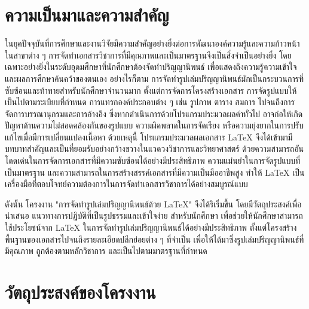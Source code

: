 
\section{ความเป็นมาและความสำคัญ} 

\hspace*{1.5em} %
ในยุคปัจจุบันที่การศึกษาและงานวิจัยมีความสำคัญอย่างยิ่งต่อการพัฒนาองค์ความรู้และความก้าวหน้าในสาขาต่าง ๆ การจัดทำเอกสารวิชาการที่มีคุณภาพและเป็นมาตรฐานจึงเป็นสิ่งจำเป็นอย่างยิ่ง โดยเฉพาะอย่างยิ่งในระดับอุดมศึกษาที่นักศึกษาต้องจัดทำปริญญานิพนธ์ เพื่อแสดงถึงความรู้ความเข้าใจและผลการศึกษาค้นคว้าของตนเอง อย่างไรก็ตาม การจัดทำรูปเล่มปริญญานิพนธ์มักเป็นกระบวนการที่ซับซ้อนและท้าทายสำหรับนักศึกษาจำนวนมาก ตั้งแต่การจัดการโครงสร้างเอกสาร การจัดรูปแบบให้เป็นไปตามระเบียบที่กำหนด การแทรกองค์ประกอบต่าง ๆ เช่น รูปภาพ ตาราง สมการ ไปจนถึงการจัดการบรรณานุกรมและการอ้างอิง ซึ่งหากดำเนินการด้วยโปรแกรมประมวลผลคำทั่วไป อาจก่อให้เกิดปัญหาด้านความไม่สอดคล้องกันของรูปแบบ ความผิดพลาดในการจัดเรียง หรือความยุ่งยากในการปรับแก้ไขเมื่อมีการเปลี่ยนแปลงเนื้อหา \parencite{kopka2004guide} ด้วยเหตุนี้ โปรแกรมประมวลผลเอกสาร LaTeX จึงได้เข้ามามีบทบาทสำคัญและเป็นที่ยอมรับอย่างกว้างขวางในแวดวงวิชาการและวิทยาศาสตร์ ด้วยความสามารถอันโดดเด่นในการจัดการเอกสารที่มีความซับซ้อนได้อย่างมีประสิทธิภาพ ความแม่นยำในการจัดรูปแบบที่เป็นมาตรฐาน และความสามารถในการสร้างสรรค์เอกสารที่มีความเป็นมืออาชีพสูง ทำให้ LaTeX เป็นเครื่องมือที่ตอบโจทย์ความต้องการในการจัดทำเอกสารวิชาการได้อย่างสมบูรณ์แบบ \parencite{lamport1994latex, latexprojectabout}

\hspace*{1.5em}
ดังนั้น โครงงาน "การจัดทำรูปเล่มปริญญานิพนธ์ด้วย LaTeX" จึงได้ริเริ่มขึ้น โดยมีวัตถุประสงค์เพื่อนำเสนอ แนวทางการปฏิบัติที่เป็นรูปธรรมและเข้าใจง่าย สำหรับนักศึกษา เพื่อช่วยให้นักศึกษาสามารถใช้ประโยชน์จาก LaTeX ในการจัดทำรูปเล่มปริญญานิพนธ์ได้อย่างมีประสิทธิภาพ ตั้งแต่โครงสร้างพื้นฐานของเอกสารไปจนถึงรายละเอียดปลีกย่อยต่าง ๆ ที่จำเป็น เพื่อให้ได้มาซึ่งรูปเล่มปริญญานิพนธ์ที่มีคุณภาพ ถูกต้องตามหลักวิชาการ และเป็นไปตามมาตรฐานที่กำหนด \parencite{gratzer2008practical}



\section{วัตถุประสงค์ของโครงงาน}


